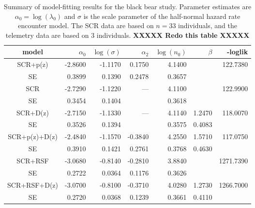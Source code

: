 \begin{table}
\centering
\caption{
Summary of model-fitting results for the black bear study. Parameter
estimates are $\alpha_{0} = \log(\lambda_{0})$ and $\sigma$ is the
scale parameter of the half-normal hazard rate encounter model.
The SCR data are based on $n=33$ individuals, and the telemetry data
are based on 3 individuals.
{\bf XXXXX Redo this table XXXXX}
}
\begin{tabular}{c|rrrrrr}
\hline \hline
model         & $\alpha_0$ & $\log(\sigma)$ & $\alpha_{2}$ & $\log(n_{0})$ & 
$\beta$       & -loglik                                                                         \\ \hline
SCR+p(z)      & -2.8600    & -1.1170        & 0.1750       & 4.1400        &        & 122.7380  \\
   SE         & 0.3899     & 0.1390         & 0.2478       & 0.3657        &        &           \\
 SCR          & -2.7290    & -1.1220        & ---          & 4.1100        &        & 122.9900  \\
   SE         & 0.3454     & 0.1404         &              & 0.3618        &        &           \\
SCR+D(z)      & -2.7150    & -1.1330        & ---          & 4.1140        & 1.2470 & 118.0070  \\
   SE         & 0.3526     & 0.1394         &              & 0.3575        & 0.4083 &           \\
SCR+p(z)+D(z) & -2.4840    & -1.1570        & -0.3840      & 4.2550        & 1.5710 & 117.0750  \\
   SE         & 0.3910     & 0.1421         & 0.2761       & 0.3768        & 0.4630 &           \\
SCR+RSF       & -3.0680    & -0.8140        & -0.2810      & 3.8840        &        & 1271.7390 \\
   SE         & 0.2722     & 0.0364         & 0.1176       & 0.3626        &        &           \\
SCR+RSF+D(z)  & -3.0700    & -0.8100        & -0.3710      & 4.0280        & 1.2730 & 1266.7000 \\
   SE         & 0.2720     & 0.0368         & 0.1239       & 0.3661        & 0.4110 &           \\
\hline
\end{tabular}
\label{tab.nyresults}
\end{table}



